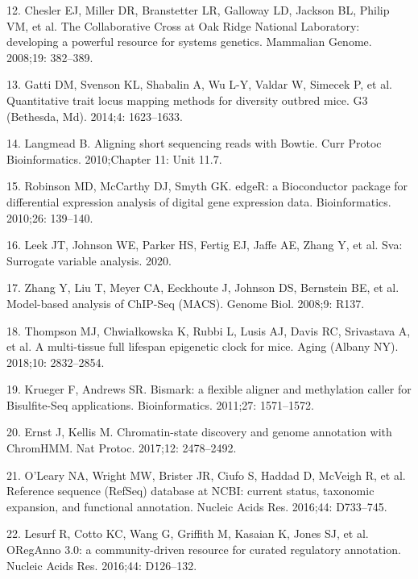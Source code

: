 \documentclass[10pt,letterpaper]{article}
\newenvironment{cslreferences}%
  {}%
  {\par}
\begin{document}
\begin{cslreferences}
\leavevmode\hypertarget{ref-Chesler:2008ge}{}%
12. Chesler EJ, Miller DR, Branstetter LR, Galloway LD, Jackson BL,
Philip VM, et al. The Collaborative Cross at Oak Ridge National
Laboratory: developing a powerful resource for systems genetics.
Mammalian Genome. 2008;19: 382--389.

\leavevmode\hypertarget{ref-Gatti:2014ko}{}%
13. Gatti DM, Svenson KL, Shabalin A, Wu L-Y, Valdar W, Simecek P, et
al. Quantitative trait locus mapping methods for diversity outbred mice.
G3 (Bethesda, Md). 2014;4: 1623--1633.

\leavevmode\hypertarget{ref-pmid21154709}{}%
14. Langmead B. Aligning short sequencing reads with Bowtie. Curr Protoc
Bioinformatics. 2010;Chapter 11: Unit 11.7.

\leavevmode\hypertarget{ref-pmid19910308}{}%
15. Robinson MD, McCarthy DJ, Smyth GK. edgeR: a Bioconductor package
for differential expression analysis of digital gene expression data.
Bioinformatics. 2010;26: 139--140.

\leavevmode\hypertarget{ref-sva}{}%
16. Leek JT, Johnson WE, Parker HS, Fertig EJ, Jaffe AE, Zhang Y, et al.
Sva: Surrogate variable analysis. 2020.

\leavevmode\hypertarget{ref-pmid18798982}{}%
17. Zhang Y, Liu T, Meyer CA, Eeckhoute J, Johnson DS, Bernstein BE, et
al. Model-based analysis of ChIP-Seq (MACS). Genome Biol. 2008;9: R137.

\leavevmode\hypertarget{ref-pmid30348905}{}%
18. Thompson MJ, Chwiałkowska K, Rubbi L, Lusis AJ, Davis RC, Srivastava
A, et al. A multi-tissue full lifespan epigenetic clock for mice. Aging
(Albany NY). 2018;10: 2832--2854.

\leavevmode\hypertarget{ref-pmid21493656}{}%
19. Krueger F, Andrews SR. Bismark: a flexible aligner and methylation
caller for Bisulfite-Seq applications. Bioinformatics. 2011;27:
1571--1572.

\leavevmode\hypertarget{ref-pmid29120462}{}%
20. Ernst J, Kellis M. Chromatin-state discovery and genome annotation
with ChromHMM. Nat Protoc. 2017;12: 2478--2492.

\leavevmode\hypertarget{ref-pmid26553804}{}%
21. O'Leary NA, Wright MW, Brister JR, Ciufo S, Haddad D, McVeigh R, et
al. Reference sequence (RefSeq) database at NCBI: current status,
taxonomic expansion, and functional annotation. Nucleic Acids Res.
2016;44: D733--745.

\leavevmode\hypertarget{ref-pmid26578589}{}%
22. Lesurf R, Cotto KC, Wang G, Griffith M, Kasaian K, Jones SJ, et al.
ORegAnno 3.0: a community-driven resource for curated regulatory
annotation. Nucleic Acids Res. 2016;44: D126--132.


\end{cslreferences}
\end{document}
